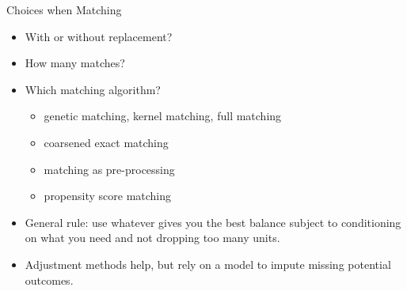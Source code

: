\documentclass[xcolor=dvipsnames]{beamer}
\newcommand{\Var}{\mathrm{Var}}
\begin{document}
\begin{frame}{Choices when Matching}
\small
\begin{itemize}
\itemsep1pt\parskip0pt
\item
  With or without replacement? \pause
\item
  How many matches? \pause
\item
  Which matching algorithm?

  \begin{itemize}
  \itemsep1pt\parskip0pt
  \item genetic matching, kernel matching, full matching
  \item coarsened exact matching
  \item matching as pre-processing
  \item propensity score matching \pause
  \end{itemize}
\item General rule: use whatever gives you the best balance subject to conditioning on what you need and not dropping too many units. \pause %
\smallskip
\item Adjustment methods help, but rely on a model to impute missing potential outcomes.
\end{itemize}
\end{frame}



%
%
\end{document}
